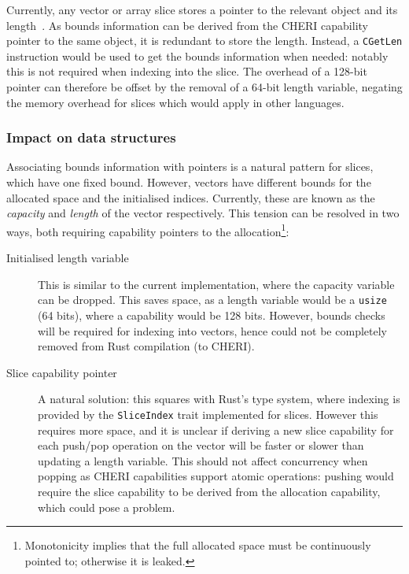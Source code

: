 \documentclass[dissertation.tex]{subfiles}
\begin{document}
Currently, any vector or array slice stores a pointer to the relevant
object and its length~\cite{blandy-orendorff}.
As bounds information can be derived from the CHERI capability pointer
to the same object, it is redundant to store the length.
Instead, a \texttt{CGetLen} instruction would be used to get the bounds
information when needed: notably this is not required when indexing into
the slice.
The overhead of a 128-bit pointer can therefore be offset by the removal
of a 64-bit length variable, negating the memory overhead for slices
which would apply in other languages.

\subsubsection{Impact on data structures}
Associating bounds information with pointers is a natural pattern for
slices, which have one fixed bound.
However, vectors have different bounds for the allocated space and the
initialised indices.
Currently, these are known as the \emph{capacity} and \emph{length} of
the vector respectively.
This tension can be resolved in two ways, both requiring capability
pointers to the allocation\footnote{
Monotonicity implies that the full allocated space must be continuously
pointed to; otherwise it is leaked.
}:

\begin{description}
    \item[Initialised length variable] This is similar to the current
    implementation, where the capacity variable can be dropped.
    This saves space, as a length variable would be a \texttt{usize} (64
    bits), where a capability would be 128 bits.
    However, bounds checks will be required for indexing into vectors,
    hence could not be completely removed from Rust compilation (to
    CHERI).
    \item[Slice capability pointer] A natural solution: this squares
    with Rust's type system, where indexing is provided by the
    \texttt{SliceIndex} trait implemented for slices.
    However this requires more space, and it is unclear if deriving a
    new slice capability for each push/pop operation on the vector will
    be faster or slower than updating a length variable.
    This should not affect concurrency when popping as CHERI
    capabilities support atomic operations: pushing would require the
    slice capability to be derived from the allocation capability, which
    could pose a problem.
\end{description}
\end{document}
